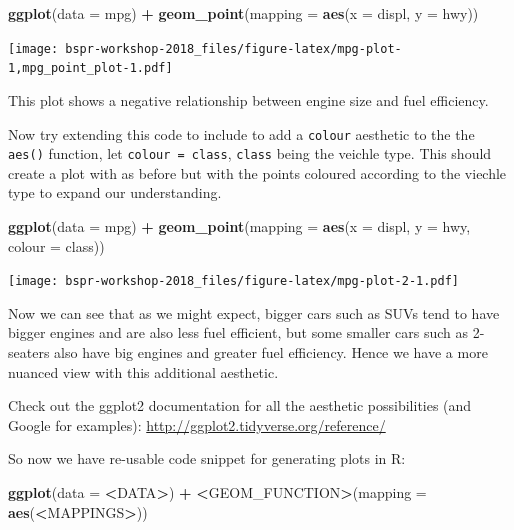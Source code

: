 \documentclass[12pt,]{book}
\newenvironment{Shaded}{\begin{snugshade}}{\end{snugshade}}
\newcommand{\DataTypeTok}[1]{\textcolor[rgb]{0.13,0.29,0.53}{#1}}
\newcommand{\ErrorTok}[1]{\textcolor[rgb]{0.64,0.00,0.00}{\textbf{#1}}}
\newcommand{\KeywordTok}[1]{\textcolor[rgb]{0.13,0.29,0.53}{\textbf{#1}}}
\newcommand{\NormalTok}[1]{#1}
\newcommand{\OperatorTok}[1]{\textcolor[rgb]{0.81,0.36,0.00}{\textbf{#1}}}
\newcommand{\StringTok}[1]{\textcolor[rgb]{0.31,0.60,0.02}{#1}}
\begin{document}
\begin{Shaded}
\begin{Highlighting}[]
\KeywordTok{ggplot}\NormalTok{(}\DataTypeTok{data =}\NormalTok{ mpg) }\OperatorTok{+}\StringTok{ }
\StringTok{  }\KeywordTok{geom_point}\NormalTok{(}\DataTypeTok{mapping =} \KeywordTok{aes}\NormalTok{(}\DataTypeTok{x =}\NormalTok{ displ, }\DataTypeTok{y =}\NormalTok{ hwy))}
\end{Highlighting}
\end{Shaded}

\texttt{[image: bspr-workshop-2018\_files/figure-latex/mpg-plot-1,mpg\_point\_plot-1.pdf]}

This plot shows a negative relationship between engine size and fuel
efficiency.

Now try extending this code to include to add a \texttt{colour} aesthetic to the
the \texttt{aes()} function, let \texttt{colour\ =\ class}, \texttt{class} being the veichle type.
This should create a plot with as before but with the points coloured
according to the viechle type to expand our understanding.

\begin{Shaded}
\begin{Highlighting}[]
\KeywordTok{ggplot}\NormalTok{(}\DataTypeTok{data =}\NormalTok{ mpg) }\OperatorTok{+}\StringTok{ }
\StringTok{  }\KeywordTok{geom_point}\NormalTok{(}\DataTypeTok{mapping =} \KeywordTok{aes}\NormalTok{(}\DataTypeTok{x =}\NormalTok{ displ, }\DataTypeTok{y =}\NormalTok{ hwy, }\DataTypeTok{colour =}\NormalTok{ class))}
\end{Highlighting}
\end{Shaded}

\texttt{[image: bspr-workshop-2018\_files/figure-latex/mpg-plot-2-1.pdf]}

Now we can see that as we might expect, bigger cars such as SUVs tend to have
bigger engines and are also less fuel efficient, but some smaller cars such as
2-seaters also have big engines and greater fuel efficiency. Hence we have a
more nuanced view with this additional aesthetic.

Check out the ggplot2 documentation for all the aesthetic possibilities (and
Google for examples): \url{http://ggplot2.tidyverse.org/reference/}

So now we have re-usable code snippet for generating plots in R:

\begin{Shaded}
\begin{Highlighting}[]
\KeywordTok{ggplot}\NormalTok{(}\DataTypeTok{data =} \OperatorTok{<}\NormalTok{DATA}\OperatorTok{>}\NormalTok{) }\OperatorTok{+}\StringTok{ }
\StringTok{  }\ErrorTok{<}\NormalTok{GEOM_FUNCTION}\OperatorTok{>}\NormalTok{(}\DataTypeTok{mapping =} \KeywordTok{aes}\NormalTok{(}\OperatorTok{<}\NormalTok{MAPPINGS}\OperatorTok{>}\NormalTok{))}
\end{Highlighting}
\end{Shaded}
\end{document}
